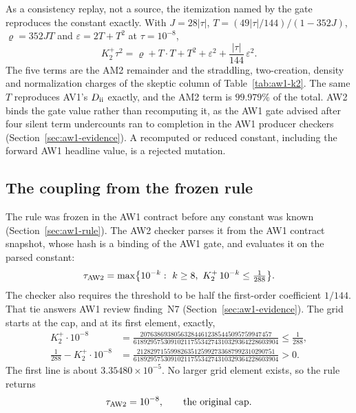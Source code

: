 As a consistency replay, not a source, the itemization named by the gate
reproduces the constant exactly. With $J=28|\tau|$,
$T=(49|\tau|/144)/(1-352J)$, $\varrho=352JT$ and $\varepsilon=2T+T^2$ at
$\tau=10^{-8}$,
\begin{equation}
 K_2^+\tau^2=\varrho+T\cdot T+T^2+\varepsilon^2+\frac{|\tau|}{144}\,\varepsilon^2 .
 \label{eq:aw2-itemization}
\end{equation}
The five terms are the AM2 remainder and the straddling, two-creation,
density and normalization charges of the skeptic column of
Table~\ref{tab:aw1-k2}. The same $T$ reproduces AV1's $D_{\rm ii}$ exactly,
and the AM2 term is $99.979\%$ of the total. AW2 binds the gate value rather
than recomputing it, as the AW1 gate advised after four silent term
undercounts ran to completion in the AW1 producer checkers
(Section~\ref{sec:aw1-evidence}). A recomputed or reduced constant, including
the forward AW1 headline value, is a rejected mutation.

\subsection{The coupling from the frozen rule}
\label{sec:aw2-rule}
The rule was frozen in the AW1 contract before any constant was known
(Section~\ref{sec:aw1-rule}). The AW2 checker parses it from the AW1 contract
snapshot, whose hash is a binding of the AW1 gate, and evaluates it on the
parsed constant:
\begin{equation}
 \tau_{\rm AW2}=\max\bigl\{10^{-k}:\ k\ge8,\ K_2^+\,10^{-k}\le\tfrac1{288}\bigr\}.
 \label{eq:aw2-rule}
\end{equation}
The checker also requires the threshold to be half the first-order
coefficient $1/144$. That tie answers AW1 review finding~N7
(Section~\ref{sec:aw1-evidence}). The grid starts at the cap, and at its first
element, exactly,
\begin{equation}
 \begin{aligned}
 K_2^+\cdot10^{-8}
 &=\frac{207638693805632844612385445095759947457}{6189295753091021175534274310329364228603904}
 \le\frac1{288},\\
 \frac1{288}-K_2^+\cdot10^{-8}
 &=\frac{21282971559982635125992733687992310290751}{6189295753091021175534274310329364228603904}>0 .
 \end{aligned}
 \label{eq:aw2-rule-step}
\end{equation}
The first line is about $3.35480\times10^{-5}$. No larger grid element
exists, so the rule returns
\begin{equation}
 \tau_{\rm AW2}=10^{-8},\qquad\text{the original cap.}
 \label{eq:aw2-tau}
\end{equation}

